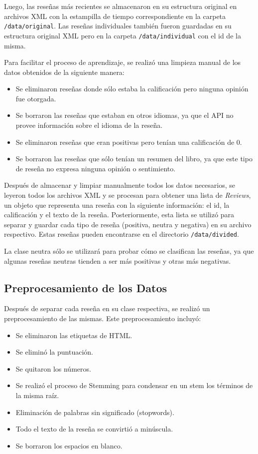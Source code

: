 \documentclass[hidelinks]{sig-alternate-05-2015}
\begin{document}
Luego, las reseñas más recientes se almacenaron en su estructura original en archivos XML con la estampilla de tiempo correspondiente en la carpeta \texttt{/data/original}. Las reseñas individuales también fueron guardadas en su estructura original XML pero en la carpeta \texttt{/data/individual} con el id de la misma.

Para facilitar el proceso de aprendizaje, se realizó una limpieza manual de los datos obtenidos de la siguiente manera:
\begin{itemize}
\item Se eliminaron reseñas donde sólo estaba la calificación pero ninguna opinión fue otorgada.
\item Se borraron las reseñas que estaban en otros idiomas, ya que el API no provee información sobre el idioma de la reseña.
\item Se eliminaron reseñas que eran positivas pero tenían una calificación de 0.
\item Se borraron las reseñas que sólo tenían un resumen del libro, ya que este tipo de reseña no expresa ninguna opinión o sentimiento.
\end{itemize}

Después de almacenar y limpiar manualmente todos los datos necesarios, se leyeron todos los archivos XML y se procesan para obtener una lista de \textit{Reviews}, un objeto que representa una reseña con la siguiente información: el id, la calificación y el texto de la reseña. Posteriormente, esta lista se utilizó para separar y guardar cada tipo de reseña (positiva, neutra y negativa) en su archivo respectivo. Estas reseñas pueden encontrarse en el directorio \texttt{/data/divided}.

La clase neutra sólo se utilizará para probar cómo se clasifican las reseñas, ya que algunas reseñas neutras tienden a ser más positivas y otras más negativas.

\subsection{Preprocesamiento de los Datos}

Después de separar cada reseña en su clase respectiva, se realizó un preprocesamiento de las mismas. Este preprocesamiento incluyó: 
\begin{itemize}
\item Se eliminaron las etiquetas de HTML.
\item Se eliminó la puntuación.
\item Se quitaron los números.
\item Se realizó el proceso de Stemming para condensar en un stem los términos de la misma raíz.
\item Eliminación de palabras sin significado (stopwords).
\item Todo el texto de la reseña se convirtió a minúscula. 
\item Se borraron los espacios en blanco.
\end{itemize}
\end{document}
